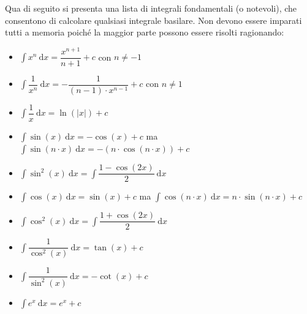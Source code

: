 \documentclass[a4paper]{article}
\begin{document}
	Qua di seguito si presenta una lista di integrali fondamentali (o notevoli), che consentono di calcolare qualsiasi integrale basilare. Non devono essere imparati tutti a memoria poiché la maggior parte possono essere risolti ragionando:
	\begin{itemize}
		\item $\displaystyle\int x^{n} \: \mathrm{d}x = \dfrac{x^{n+1}}{n+1}+c$ \hspace{1em} con $n \ne -1$

		\item $\displaystyle\int \dfrac{1}{x^{n}} \: \mathrm{d}x = - \dfrac{1}{\left(n-1\right) \cdot x^{n-1}} + c$ \hspace{1em} con $n \ne 1$

		\item $\displaystyle\int \dfrac{1}{x} \: \mathrm{d}x = \ln\left(|x|\right) + c$

		\item $\displaystyle\int \sin\left(x\right) \: \mathrm{d}x = -\cos\left(x\right) + c$ \hspace{.5em} ma \hspace{.5em} $\displaystyle\int \sin\left(n \cdot x\right) \: \mathrm{d}x = -\left(n \cdot \cos\left(n \cdot x\right)\right) + c$
		
		\item $\displaystyle\int \sin^{2}\left(x\right) \: \mathrm{d}x = \int\dfrac{1-\cos\left(2x\right)}{2} \:\mathrm{d}x$

		\item $\displaystyle\int \cos\left(x\right) \: \mathrm{d}x = \sin\left(x\right) + c$ \hspace{.5em} ma \hspace{.5em} $\displaystyle\int \cos\left(n \cdot x\right) \: \mathrm{d}x = n \cdot \sin\left(n \cdot x\right) + c$
		
		\item $\displaystyle\int \cos^{2}\left(x\right) \: \mathrm{d}x = \int\dfrac{1+\cos\left(2x\right)}{2} \:\mathrm{d}x$

		\item $\displaystyle\int \dfrac{1}{\cos^{2}\left(x\right)} \: \mathrm{d}x = \tan\left(x\right) + c$

		\item $\displaystyle\int \dfrac{1}{\sin^{2}\left(x\right)} \: \mathrm{d}x = -\cot\left(x\right) + c$

		\item $\displaystyle\int e^{x} \: \mathrm{d}x = e^{x} + c$


\end{itemize}
\end{document}
